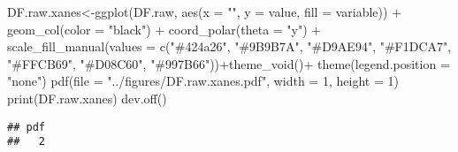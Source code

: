 \documentclass[
]{article}
\newenvironment{Shaded}{\begin{snugshade}}{\end{snugshade}}
\newcommand{\AttributeTok}[1]{\textcolor[rgb]{0.77,0.63,0.00}{#1}}
\newcommand{\DecValTok}[1]{\textcolor[rgb]{0.00,0.00,0.81}{#1}}
\newcommand{\FunctionTok}[1]{\textcolor[rgb]{0.00,0.00,0.00}{#1}}
\newcommand{\NormalTok}[1]{#1}
\newcommand{\OtherTok}[1]{\textcolor[rgb]{0.56,0.35,0.01}{#1}}
\newcommand{\SpecialCharTok}[1]{\textcolor[rgb]{0.00,0.00,0.00}{#1}}
\newcommand{\StringTok}[1]{\textcolor[rgb]{0.31,0.60,0.02}{#1}}
\begin{document}
\begin{Shaded}
\begin{Highlighting}[]
\NormalTok{DF.raw.xanes}\OtherTok{\textless{}{-}}\FunctionTok{ggplot}\NormalTok{(DF.raw, }\FunctionTok{aes}\NormalTok{(}\AttributeTok{x =} \StringTok{""}\NormalTok{, }\AttributeTok{y =}\NormalTok{ value, }\AttributeTok{fill =}\NormalTok{ variable)) }\SpecialCharTok{+}
    \FunctionTok{geom\_col}\NormalTok{(}\AttributeTok{color =} \StringTok{"black"}\NormalTok{) }\SpecialCharTok{+}
    \FunctionTok{coord\_polar}\NormalTok{(}\AttributeTok{theta =} \StringTok{"y"}\NormalTok{) }\SpecialCharTok{+} \FunctionTok{scale\_fill\_manual}\NormalTok{(}\AttributeTok{values =} \FunctionTok{c}\NormalTok{(}\StringTok{"\#424a26"}\NormalTok{, }\StringTok{"\#9B9B7A"}\NormalTok{, }\StringTok{"\#D9AE94"}\NormalTok{, }\StringTok{"\#F1DCA7"}\NormalTok{, }\StringTok{"\#FFCB69"}\NormalTok{, }\StringTok{"\#D08C60"}\NormalTok{, }\StringTok{"\#997B66"}\NormalTok{))}\SpecialCharTok{+}\FunctionTok{theme\_void}\NormalTok{()}\SpecialCharTok{+}
    \FunctionTok{theme}\NormalTok{(}\AttributeTok{legend.position =} \StringTok{"none"}\NormalTok{)}
\FunctionTok{pdf}\NormalTok{(}\AttributeTok{file =} \StringTok{"../figures/DF.raw.xanes.pdf"}\NormalTok{, }\AttributeTok{width =} \DecValTok{1}\NormalTok{, }\AttributeTok{height =} \DecValTok{1}\NormalTok{) }
\FunctionTok{print}\NormalTok{(DF.raw.xanes)}
\FunctionTok{dev.off}\NormalTok{()}
\end{Highlighting}
\end{Shaded}

\begin{verbatim}
## pdf 
##   2
\end{verbatim}
\end{document}
